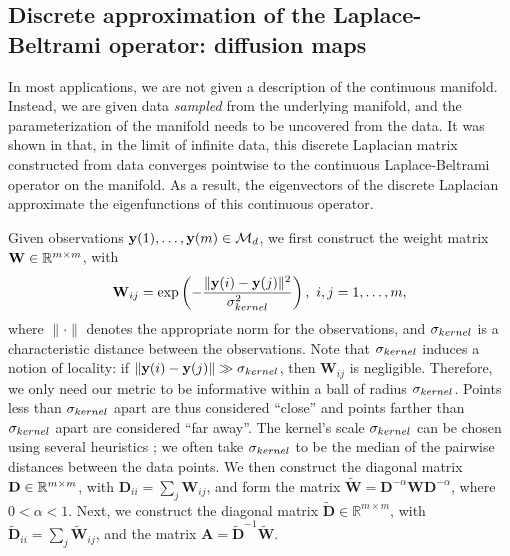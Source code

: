 \subsection{Discrete approximation of the Laplace-Beltrami operator: diffusion maps} \label{sec:dmaps}

In most applications, we are not given a description of the continuous manifold.
%
Instead, we are given data {\em sampled} from the underlying manifold, and the parameterization of the manifold needs to be uncovered from the data.
%
It was shown in \cite{coifman2006geometric} that, in the limit of infinite data, this discrete Laplacian matrix constructed from data converges pointwise to the continuous Laplace-Beltrami operator on the manifold.
%
As a result, the eigenvectors of the discrete Laplacian approximate the eigenfunctions of this continuous operator.

Given observations $\mathbf{y}(1), \dots, \mathbf{y}(m) \in \mathcal{M}_d$, we first construct the weight matrix $\mathbf{W} \in \mathbb{R}^{m \times m}$, with
\begin{equation} \label{eq:W} 
\mathbf{W}_{ij} = \exp \left( -\frac{\|\mathbf{y}(i) - \mathbf{y}(j) \|^2}{\sigma_{kernel}^2} \right), \ i,j=1,\ldots,m,
\end{equation}
where $\| \cdot \|$ denotes the appropriate norm for the observations, and $\sigma_{kernel}$ is a characteristic distance between the observations.
%
Note that $\sigma_{kernel}$ induces a notion of locality: if $\|\mathbf{y}(i) - \mathbf{y}(j) \| \gg \sigma_{kernel}$, then $\mathbf{W}_{ij}$ is negligible.
%
Therefore, we only need our metric to be informative within a ball of radius $\sigma_{kernel}$.
%
Points less than $\sigma_{kernel}$ apart are thus considered ``close'' and points farther than $\sigma_{kernel}$ apart are considered ``far away''.
%
The kernel's scale $\sigma_{kernel}$ can be chosen using several heuristics \cite{rohrdanz2011determination, coifman2008graph}; we often take $\sigma_{kernel}$ to be the median of the pairwise distances between the data points.
%
We then construct the diagonal matrix $\mathbf{D} \in \mathbb{R}^{m \times m}$, with $\mathbf{D}_{ii} = \sum_j \mathbf{W}_{ij}$, and form the matrix $\widetilde{\mathbf{W}} = \mathbf{D}^{-\alpha} \mathbf{W} \mathbf{D}^{-\alpha}$, where $0 < \alpha < 1$. 
%
Next, we construct the diagonal matrix $\widetilde{\mathbf{D}} \in \mathbb{R}^{m \times m}$, with $\widetilde{\mathbf{D}}_{ii} = \sum_j \widetilde{\mathbf{W}}_{ij}$, and the matrix $\mathbf{A}  = \widetilde{\mathbf{D}}^{-1} \widetilde{\mathbf{W}}.$

